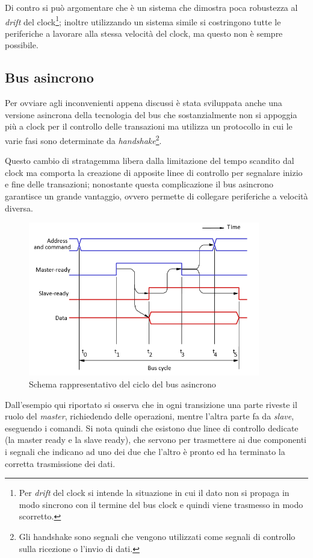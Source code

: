 \documentclass[class=book, crop=false, oneside]{standalone}
\begin{document}
Di contro si può argomentare che è un sistema che dimostra poca robustezza al \emph{drift} del clock\footnote{Per \emph{drift} del clock si intende la situazione in cui il dato non si propaga in modo sincrono con il  termine del bus clock e quindi viene trasmesso in modo scorretto.}; inoltre utilizzando un sistema simile si costringono tutte le periferiche a lavorare alla stessa velocità del clock, ma questo non è sempre possibile.

\subsection{Bus asincrono}
Per ovviare agli inconvenienti appena discussi è stata sviluppata anche una versione asincrona della tecnologia del bus che sostanzialmente non si appoggia più a clock per il controllo delle transazioni ma utilizza un protocollo in cui le varie fasi sono determinate da \emph{handshake}\footnote{Gli handshake sono segnali che vengono utilizzati come segnali di controllo sulla ricezione o l'invio di dati.}.

Questo cambio di stratagemma libera dalla limitazione del tempo scandito dal clock ma comporta la creazione di apposite linee di controllo per segnalare inizio e fine delle transazioni;
nonostante questa complicazione il bus asincrono garantisce un grande vantaggio, ovvero permette di collegare periferiche a velocità diversa.

\begin{figure}[H]
	\centering
	\includegraphics[width=0.9\textwidth,keepaspectratio]{bus-asincrono}
	\caption{Schema rappresentativo del ciclo del bus asincrono}
\end{figure}
Dall'esempio qui riportato si osserva che in ogni transizione una parte riveste il ruolo del \emph{master}, richiedendo delle operazioni, mentre l'altra parte fa da \emph{slave}, eseguendo i comandi.
Si nota quindi che esistono due linee di controllo dedicate (la master ready e la slave ready), che servono per trasmettere ai due componenti i segnali che indicano ad uno dei due che l'altro è pronto ed ha terminato la corretta trasmissione dei dati.
\end{document}
